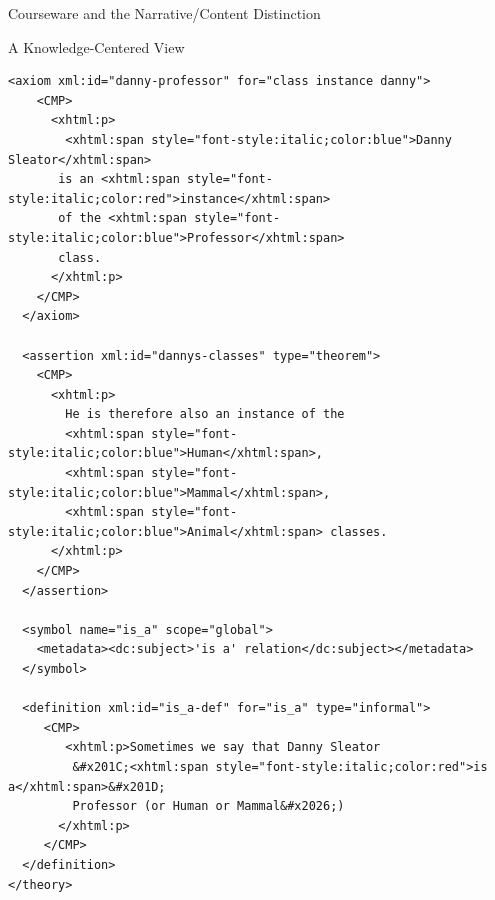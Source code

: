 \begin{tchapter}[id=courseware]{Courseware and the Narrative/Content Distinction}
\begin{tsection}[id=knowledge-centered]{A Knowledge-Centered View}
\begin{lstlisting}[label=lst:ann-cvi-ex,
    caption={The {\omdoc} Representation for Slide 3 from {\myfigref{15-211}}},
    index={theory,imports,axiom,symbol,assertion,definition,CMP}]
  <axiom xml:id="danny-professor" for="class instance danny">
    <CMP>
      <xhtml:p>
        <xhtml:span style="font-style:italic;color:blue">Danny Sleator</xhtml:span>
       is an <xhtml:span style="font-style:italic;color:red">instance</xhtml:span> 
       of the <xhtml:span style="font-style:italic;color:blue">Professor</xhtml:span> 
       class.
      </xhtml:p>
    </CMP>
  </axiom>

  <assertion xml:id="dannys-classes" type="theorem">
    <CMP>
      <xhtml:p>
        He is therefore also an instance of the 
        <xhtml:span style="font-style:italic;color:blue">Human</xhtml:span>, 
        <xhtml:span style="font-style:italic;color:blue">Mammal</xhtml:span>, 
        <xhtml:span style="font-style:italic;color:blue">Animal</xhtml:span> classes.
      </xhtml:p>
    </CMP>
  </assertion>

  <symbol name="is_a" scope="global">
    <metadata><dc:subject>'is a' relation</dc:subject></metadata>
  </symbol>

  <definition xml:id="is_a-def" for="is_a" type="informal">
     <CMP>
        <xhtml:p>Sometimes we say that Danny Sleator 
         &#x201C;<xhtml:span style="font-style:italic;color:red">is a</xhtml:span>&#x201D; 
         Professor (or Human or Mammal&#x2026;)
       </xhtml:p>
     </CMP>
  </definition>
</theory>
\end{lstlisting}


\end{tsection}
\end{tchapter}
